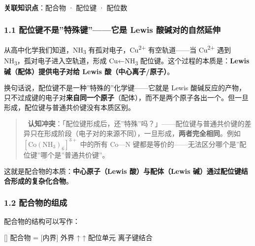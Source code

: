 \documentclass[a4paper,11pt]{ctexart}
\newenvironment{Shaded}{}{}
\newenvironment{Highlighting}{}{}
\newcommand{\NormalTok}[1]{#1}
\begin{document}
\textbf{关联知识点}：配合物 · 配位键 · 配位数

\subsubsection{1.1 配位键不是''特殊键''------它是 Lewis 酸碱对的自然延伸}\label{ux914dux4f4dux952eux4e0dux662fux7279ux6b8aux952eux5b83ux662f-lewis-ux9178ux78b1ux5bf9ux7684ux81eaux7136ux5ef6ux4f38}

从高中化学我们知道，NH\textsubscript{3} 有孤对电子，Cu\textsuperscript{2+} 有空轨道------当 Cu\textsuperscript{2+} 遇到 NH\textsubscript{3}，孤对电子进入空轨道，形成 Cu←NH\textsubscript{3} 配位键。这个过程的本质是：\textbf{Lewis 碱（配体）提供电子对给 Lewis 酸（中心离子/原子）}。

换句话说，配位键不是一种''特殊的''化学键------它就是 Lewis 酸碱反应的产物，只不过成键的电子对\textbf{来自同一个原子}（配体），而不是两个原子各出一个。但一旦形成，配位键与普通共价键没有本质区别。

\begin{quote}
🧠 \textbf{认知冲突}：「配位键形成后，还''特殊''吗？」------配位键与普通共价键的差异只在形成阶段（电子对的来源不同），一旦形成，\textbf{两者完全相同}。例如 \([\mathrm{Co(NH_3)_6}]^{3+}\) 中的所有 Co---N 键都是等价的------无法区分哪个是''配位键''哪个是''普通共价键''。
\end{quote}

这就是配合物的本质：\textbf{中心原子（Lewis 酸）与配体（Lewis 碱）通过配位键结合形成的复杂化合物}。

\subsubsection{1.2 配合物的组成}\label{ux914dux5408ux7269ux7684ux7ec4ux6210}

配合物的结构可以写作：

\begin{Shaded}
\begin{Highlighting}[]
\NormalTok{配合物 = [内界] 外界}
\NormalTok{          ↑       ↑}
\NormalTok{      配位单元   离子键结合}
\end{Highlighting}
\end{Shaded}
\end{document}
